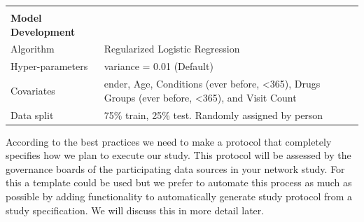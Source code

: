 \documentclass[]{article}
\begin{document}
\begin{longtable}[]{@{}ll@{}}
\begin{minipage}[t]{0.42\columnwidth}\raggedright\strut
\strut
\end{minipage} & \begin{minipage}[t]{0.51\columnwidth}\raggedright\strut
\strut
\end{minipage}\tabularnewline
\begin{minipage}[t]{0.42\columnwidth}\raggedright\strut
\textbf{Model Development}\strut
\end{minipage} & \begin{minipage}[t]{0.51\columnwidth}\raggedright\strut
\strut
\end{minipage}\tabularnewline
\begin{minipage}[t]{0.42\columnwidth}\raggedright\strut
Algorithm\strut
\end{minipage} & \begin{minipage}[t]{0.51\columnwidth}\raggedright\strut
Regularized Logistic Regression\strut
\end{minipage}\tabularnewline
\begin{minipage}[t]{0.42\columnwidth}\raggedright\strut
Hyper-parameters\strut
\end{minipage} & \begin{minipage}[t]{0.51\columnwidth}\raggedright\strut
variance = 0.01 (Default)\strut
\end{minipage}\tabularnewline
\begin{minipage}[t]{0.42\columnwidth}\raggedright\strut
Covariates\strut
\end{minipage} & \begin{minipage}[t]{0.51\columnwidth}\raggedright\strut
ender, Age, Conditions (ever before, \textless{}365), Drugs Groups (ever
before, \textless{}365), and Visit Count\strut
\end{minipage}\tabularnewline
\begin{minipage}[t]{0.42\columnwidth}\raggedright\strut
Data split\strut
\end{minipage} & \begin{minipage}[t]{0.51\columnwidth}\raggedright\strut
75\% train, 25\% test. Randomly assigned by person\strut
\end{minipage}\tabularnewline
\bottomrule
\end{longtable}

According to the best practices we need to make a protocol that
completely specifies how we plan to execute our study. This protocol
will be assessed by the governance boards of the participating data
sources in your network study. For this a template could be used but we
prefer to automate this process as much as possible by adding
functionality to automatically generate study protocol from a study
specification. We will discuss this in more detail later.
\end{document}
